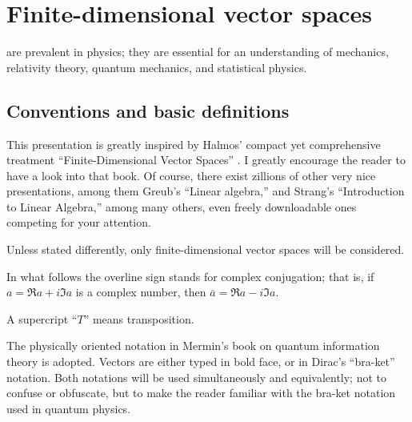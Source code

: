 \chapter{Finite-dimensional vector spaces}
\label{ch:lvs}

 are prevalent in physics;
they are essential for an understanding
of mechanics, relativity theory, quantum mechanics, and statistical physics.

\section{Conventions and basic definitions}



This presentation is greatly inspired
by Halmos' compact yet comprehensive treatment
``Finite-Dimensional Vector Spaces'' \cite{halmos-vs}.
I greatly encourage the reader to have a look into that book.
Of course, there exist zillions of other very nice presentations, among them
Greub's ``Linear algebra,'' and
Strang's ``Introduction to Linear Algebra,''
among many others, even freely downloadable  ones
\cite{Greub75,Strang:2009:ILA,Homes-rorres,lipschutz:schaul-la,Hefferon}
competing for your attention.

Unless stated differently, only
finite-dimensional vector spaces will be considered.

In what follows
the overline sign stands for complex conjugation; that is,
if
${a}= \Re a +i\Im a $ is a complex number, then
$\overline{a}= \Re a -i\Im a$.

A supercript ``$T$'' means transposition.

The physically oriented notation in Mermin's book on
quantum information theory \cite{mermin-04,mermin-07} is adopted.
Vectors are either typed in bold face, or in Dirac's ``bra-ket'' notation\cite{dirac}.
Both notations will be used simultaneously and equivalently;
not to confuse or obfuscate, but to make  the reader familiar with the bra-ket
notation used in quantum physics.

